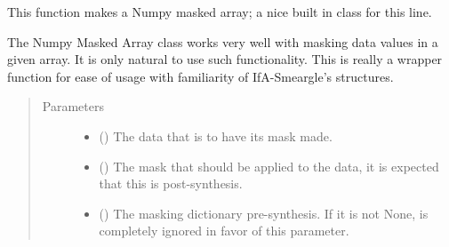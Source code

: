 \documentclass[letterpaper,10pt,english]{sphinxmanual}
\begin{document}

\begin{fulllineitems}
\label{\detokenize{python_docstrings/IfA_Smeargle.echo.echo_functions:IfA_Smeargle.echo.echo_functions.echo_numpy_masked_array}}
This function makes a Numpy masked array; a nice built in class for
this line.

The Numpy Masked Array class works very well with masking data values in
a given array. It is only natural to use such functionality. This is
really a wrapper function for ease of usage with familiarity of
IfA-Smeargle’s structures.
\begin{quote}\begin{description}
\item[{Parameters}] \leavevmode\begin{itemize}
\item {} 
 () \textendash{} The data that is to have its mask made.

\item {} 
 () \textendash{} The mask that should be applied to the data, it is expected that
this is post-synthesis.

\item {} 
 (\sphinxstyleliteralemphasis{\sphinxupquote{ (}}\sphinxstyleliteralemphasis{\sphinxupquote{)}}) \textendash{} The masking dictionary pre-synthesis. If it is not None,
 is completely ignored in favor of this parameter.

\end{itemize}

\end{description}\end{quote}

\end{fulllineitems}
\end{document}
